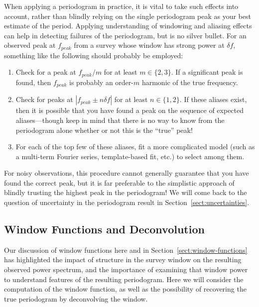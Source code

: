 \documentclass[preprint]{aastex}
\newcommand{\Sect}[1]{Section~\ref{sect:#1}}
\newcommand{\sect}[1]{\Sect{#1}}
\newcommand{\sectlabel}[1]{\label{sect:#1}}
\begin{document}
When applying a periodogram in practice, it is vital to take such effects into
account, rather than blindly relying on the single periodogram peak as your
best estimate of the period.
Applying understanding of windowing and aliasing effects can help in detecting
failures of the periodogram, but is no silver bullet.
For an observed peak at $f_{peak}$ from a survey whose window has strong power
at $\delta f$, something like the following should probably be employed:
\begin{enumerate}
  \item Check for a peak at $f_{peak}/m$ for at least $m \in \{2, 3\}$.
    If a significant peak is found, then $f_{peak}$ is probably an order-$m$
    harmonic of the true frequency.
  \item Check for peaks at $|f_{peak} \pm n\delta f|$ for at least
    $n \in \{1, 2\}$. If these aliases exist, then it is possible that you have
    found a peak on the sequence of expected aliases---though keep in mind that
    there is no way to know from the periodogram alone whether or not
    this is the ``true'' peak!
  \item For each of the top few of these aliases, fit a more complicated model
    (such as a multi-term Fourier series, template-based fit, etc.) to select
    among them.
\end{enumerate}
For noisy observations, this procedure cannot generally guarantee that you
have found the correct peak, but it is far preferable to the simplistic
approach of blindly trusting the highest peak in the periodogram!
We will come back to the question of uncertainty in the periodogram result
in \sect{uncertainties}.


\subsection{Window Functions and Deconvolution}
\sectlabel{windows-and-deconvolution}

Our discussion of window functions here and in \sect{window-functions}
has highlighted the impact of structure in the survey window on the
resulting observed power spectrum, and the importance of examining that
window power to understand features of the resulting periodogram.
Here we will consider the computation of the window function, as well
as the possibility of recovering the true periodogram by deconvolving
the window.
\end{document}
